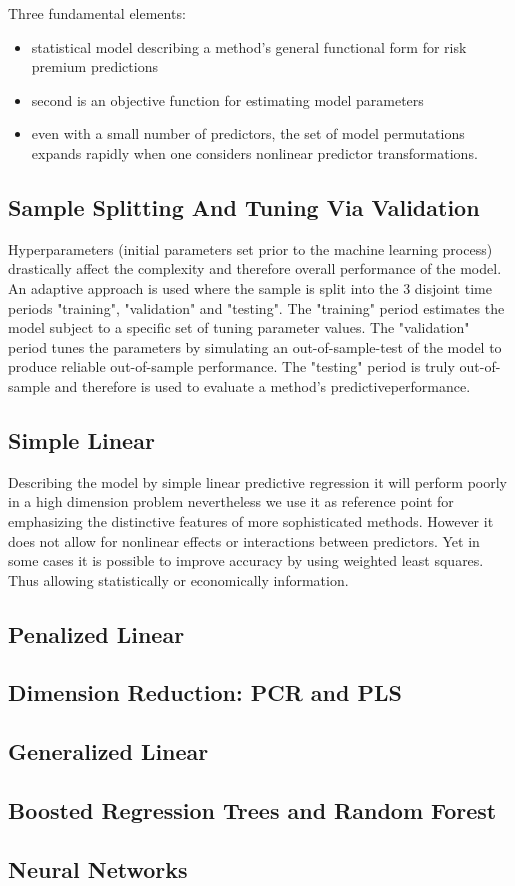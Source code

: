 \documentclass[12pt,a4paper,oneside]{book}
\begin{document}
Three fundamental elements:
\begin{itemize}
\item statistical model describing a method’s general functional form for risk premium
predictions
\item second is an objective function for estimating model parameters
\item even with a small number of predictors, the set of model permutations expands rapidly when one considers nonlinear predictor
transformations.
\end{itemize}

\subsection{Sample Splitting And Tuning Via Validation}
	Hyperparameters (initial parameters set prior to the machine learning process)
	drastically affect the complexity and therefore overall performance of the model.
	An adaptive approach is used where the sample is split into the 3 disjoint time periods
	"training", "validation" and "testing". The "training" period estimates the model
	subject to a specific set of tuning parameter values. The "validation" period
	tunes the parameters by simulating an out-of-sample-test of the model
	to produce reliable out-of-sample performance. The "testing" period is truly
	out-of-sample and therefore is used to evaluate a method’s predictiveperformance.

\subsection{Simple Linear}
	Describing the model by simple linear predictive regression it will perform poorly in a high 
	dimension problem nevertheless we use it as reference point for emphasizing the distinctive 
	features of more sophisticated methods.
	However it does not allow for nonlinear effects or interactions between predictors.
	Yet in some cases it is possible to improve accuracy by using weighted least squares.
	Thus allowing statistically or economically information.
	
\subsection{Penalized Linear}
\subsection{Dimension Reduction: PCR and PLS}
\subsection{Generalized Linear}
\subsection{Boosted Regression Trees and Random Forest}
\subsection{Neural Networks}
\end{document}
